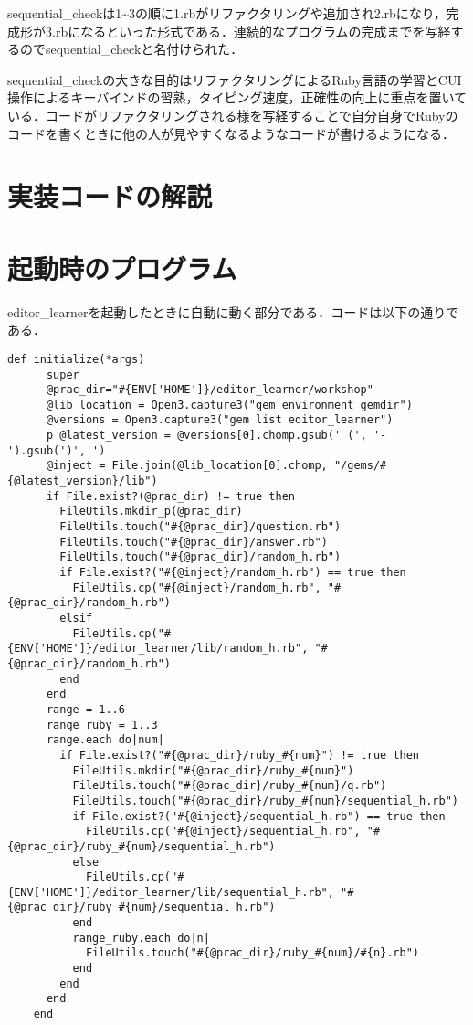 sequential\_checkは1\textasciitilde{}3の順に1.rbがリファクタリングや追加され2.rbになり，完成形が3.rbになるといった形式である．連続的なプログラムの完成までを写経するのでsequential\_checkと名付けられた．

sequential\_checkの大きな目的はリファクタリングによるRuby言語の学習とCUI操作によるキーバインドの習熟，タイピング速度，正確性の向上に重点を置いている．コードがリファクタリングされる様を写経することで自分自身でRubyのコードを書くときに他の人が見やすくなるようなコードが書けるようになる．

    \section{実装コードの解説}\label{ux5b9fux88c5ux30b3ux30fcux30c9ux306eux89e3ux8aac}

    \section{起動時のプログラム}\label{ux8d77ux52d5ux6642ux306eux30d7ux30edux30b0ux30e9ux30e0}

editor\_learnerを起動したときに自動に動く部分である．コードは以下の通りである．

\begin{verbatim}
def initialize(*args)
      super
      @prac_dir="#{ENV['HOME']}/editor_learner/workshop"
      @lib_location = Open3.capture3("gem environment gemdir")
      @versions = Open3.capture3("gem list editor_learner")
      p @latest_version = @versions[0].chomp.gsub(' (', '-').gsub(')','')
      @inject = File.join(@lib_location[0].chomp, "/gems/#{@latest_version}/lib")
      if File.exist?(@prac_dir) != true then
        FileUtils.mkdir_p(@prac_dir)
        FileUtils.touch("#{@prac_dir}/question.rb")
        FileUtils.touch("#{@prac_dir}/answer.rb")
        FileUtils.touch("#{@prac_dir}/random_h.rb")
        if File.exist?("#{@inject}/random_h.rb") == true then
          FileUtils.cp("#{@inject}/random_h.rb", "#{@prac_dir}/random_h.rb")
        elsif
          FileUtils.cp("#{ENV['HOME']}/editor_learner/lib/random_h.rb", "#{@prac_dir}/random_h.rb")
        end
      end
      range = 1..6
      range_ruby = 1..3
      range.each do|num|
        if File.exist?("#{@prac_dir}/ruby_#{num}") != true then
          FileUtils.mkdir("#{@prac_dir}/ruby_#{num}")
          FileUtils.touch("#{@prac_dir}/ruby_#{num}/q.rb")
          FileUtils.touch("#{@prac_dir}/ruby_#{num}/sequential_h.rb")
          if File.exist?("#{@inject}/sequential_h.rb") == true then
            FileUtils.cp("#{@inject}/sequential_h.rb", "#{@prac_dir}/ruby_#{num}/sequential_h.rb")
          else
            FileUtils.cp("#{ENV['HOME']}/editor_learner/lib/sequential_h.rb", "#{@prac_dir}/ruby_#{num}/sequential_h.rb")
          end
          range_ruby.each do|n|
            FileUtils.touch("#{@prac_dir}/ruby_#{num}/#{n}.rb")
          end
        end
      end
    end
\end{verbatim}

